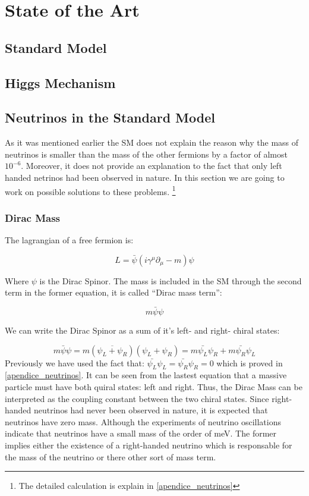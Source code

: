 \chapter{State of the Art} 

\section{Standard Model}

\section{Higgs Mechanism}

\section{Neutrinos in the Standard Model}

As it was mentioned earlier the SM does not explain the reason why the mass of neutrinos is smaller than the mass of the other fermions by a factor of almost $10^{-6}$. Moreover, it does not
provide an explanation to the fact that only left handed netrinos had been observed in nature. 
In this section we are going to work on possible solutions to these problems. \footnote{The detailed calculation is explain in \ref{apendice_neutrinos}}

\subsection{Dirac Mass}
The lagrangian of a free fermion is:

\begin{equation}
 L = \bar{\psi} \left( i \gamma ^\mu \partial_{\mu} - m \right) \psi
\end{equation}

Where $\psi$ is the Dirac Spinor. The mass is included in the SM through the second term in the former equation, it is called ``Dirac mass term'':

\begin{equation}
 m \bar{\psi} \psi
\end{equation}

We can write the Dirac Spinor as a sum of it's left- and right- chiral states:

\begin{equation}
 m \bar{\psi} \psi = m \left( \overbar{\psi_L + \psi_R} \right) \left( \psi_L + \psi_R \right) = m \bar{\psi_L} \psi_R + m \bar{\psi_R}\psi_L
\end{equation}
Previously we have used the fact that: $\bar{\psi_L}\psi_L = \bar{\psi_R}\psi_R = 0$ which is proved in \ref{apendice_neutrinos}. It can be seen from the lastest equation
that a massive particle must have both quiral states: left and right. Thus, the Dirac Mass can be interpreted as the coupling constant between the two chiral states. Since right-handed 
neutrinos had never been observed in nature, it is expected that neutrinos have zero mass. Although the experiments of neutrino oscillations indicate that neutrinos have a small mass of the order of meV. The former implies either the existence of a right-handed neutrino which is responsable for the mass of the neutrino or there other sort of mass term.


